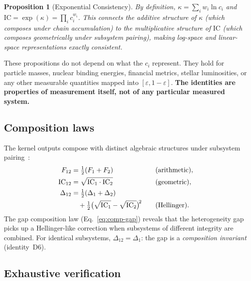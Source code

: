 \documentclass[
  aps,
  prd,
  twocolumn,
  superscriptaddress,
  nofootinbib,
  floatfix
]{revtex4-2}
\newtheorem{proposition}[theorem]{Proposition}
\newcommand{\eps}{\varepsilon}
\newcommand{\IC}{\mathrm{IC}}
\begin{document}
\begin{proposition}[Exponential Consistency]\label{prop:expmap}
By definition, $\kappa = \sum_i w_i \ln c_i$ and
$\IC = \exp(\kappa) = \prod_i c_i^{w_i}$.  This connects the additive
structure of $\kappa$ (which composes under chain accumulation) to the
multiplicative structure of $\IC$ (which composes geometrically under
subsystem pairing), making log-space and linear-space representations
exactly consistent.
\end{proposition}

These propositions do not depend on what the $c_i$ represent.  They
hold for particle masses, nuclear binding energies, financial metrics,
stellar luminosities, or any other measurable quantities mapped into
$[\eps, 1{-}\eps]$.  \textbf{The identities are properties of
measurement itself, not of any particular measured system.}

\subsection{Composition laws}

The kernel outputs compose with distinct algebraic structures under
subsystem pairing~\cite{paulus2025physicscoherence}:
\begin{alignat}{2}
  F_{12} &= \tfrac{1}{2}(F_1 + F_2)
    &\quad& \text{(arithmetic)}, \label{eq:comp-F}\\
  \IC_{12} &= \sqrt{\IC_1 \cdot \IC_2}
    && \text{(geometric)}, \label{eq:comp-IC}\\
  \Delta_{12} &= \tfrac{1}{2}(\Delta_1 + \Delta_2) \notag\\
    &\quad + \tfrac{1}{2}\bigl(\sqrt{\IC_1} - \sqrt{\IC_2}\bigr)^{\!2}
    && \text{(Hellinger)}. \label{eq:comp-gap}
\end{alignat}
The gap composition law (Eq.~\ref{eq:comp-gap}) reveals that the
heterogeneity gap picks up a Hellinger-like correction when subsystems
of different integrity are combined.  For identical subsystems,
$\Delta_{12} = \Delta_1$: the gap is a \emph{composition invariant}
(identity~D6).

\subsection{Exhaustive verification}
\end{document}
